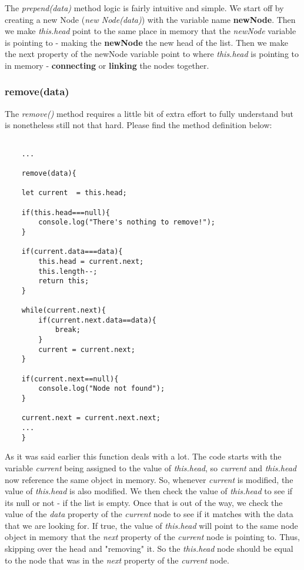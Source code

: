 \documentclass{article}
\begin{document}
The \textit{prepend(data)} method logic is fairly intuitive and simple. We start off by creating a new Node (\textit{new Node(data)})  with the variable name \textbf{newNode}. Then we make \textit{this.head }point to the same place in memory that the \textit{newNode}
variable is pointing to - making the \textbf{newNode} the new head of the list. Then we make the next property of the newNode variable point to where \textit{this.head} is pointing to in memory - \textbf{connecting} or \textbf{linking} the nodes together.


\newpage
\subsubsection{remove(data)}

The \textit{remove()} method requires a little bit of extra effort to fully understand but is nonetheless still not that hard. Please find the method definition below:

\begin{verbatim}
    
    ...

    remove(data){

    let current  = this.head;

    if(this.head===null){
        console.log("There's nothing to remove!");
    }

    if(current.data===data){
        this.head = current.next;
        this.length--;
        return this;
    }

    while(current.next){
        if(current.next.data==data){
            break;
        }
        current = current.next;
    }

    if(current.next==null){
        console.log("Node not found");
    }

    current.next = current.next.next;
    ...
    }

\end{verbatim}

As it was said earlier this function deals with a lot. The code starts with the variable \textit{current} being assigned to the value of \textit{this.head}, so \textit{current} and \textit{this.head} now reference the same object in memory. 
So, whenever \textit{current} is modified, the value of \textit{this.head} is also modified. We then check the value of \textit{this.head} to see if its null or not - if the list is empty. Once that is out of the way, we check the value of the \textit{data} property of the \textit{current} node to see if it matches with the data that we are looking for. 
If true, the value of \textit{this.head} will point to the same node object in memory that the \textit{next} property of the \textit{current} node is pointing to. Thus, skipping over the head and "removing" it. So the \textit{this.head }node should be equal to the node that was in the \textit{next} property of the \textit{current} node.\\
\end{document}
